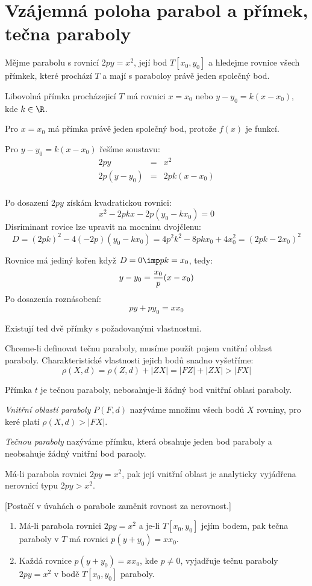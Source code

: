 
\BeginDoc{}
\section{Vzájemná poloha parabol a přímek, tečna paraboly}

\Pr
Mějme parabolu s rovnicí $2py  = x^2$, její bod $T[x_0,y_0]$ a hledejme rovnice všech přímkek, které prochází $T$ a mají s paraboloy právě jeden společný bod.

Libovolná přímka procházejicí $T$ má rovnici $x = x_0$ nebo $y-y_0 = k (x-x_0)$, kde $k\in\R$.

Pro $x = x_0$ má přímka právě jeden společný bod, protože $f(x)$ je funkcí.

Pro $y-y_0 = k(x-x_0)$ řešíme soustavu:
\begin{eqnarray}
	2py &=& x^2\\
	2p(y-y_0) &=& 2pk(x-x_0)\\
\end{eqnarray}

Po dosazení $2py$ získám kvadratickou rovnici:
$$ x^2 - 2pkx - 2p (y_0 - kx_0)  = 0 $$
Disriminant rovice lze upravit na mocninu dvojčlenu:
$$ D = (2pk)^2 - 4 (-2p)(y_0-kx_0) = 4p^2k^2 - 8 pkx_0 + 4 x_0^2 = (2pk - 2x_0)^2 $$

Rovnice má jediný kořen když $D = 0 \imp pk = x_0$, tedy:
$$y-y_0 = \frac{x_0}{p} (x-x_0)$$
Po dosazenía roznásobení:
$$ py + py_0 = xx_0 $$

Existují ted dvě přímky s požadovanými vlastnostmi.

\Poz Chceme-li definovat tečnu paraboly, musíme použít pojem vnitřní oblast paraboly.
Charakteristické vlastnosti jejich bodů snadno vyšetříme:
$$ \rho(X,d) = \rho(Z,d) + |ZX| = |FZ| + |ZX| > |FX| $$

Přímka $t$ je tečnou paraboly, nebosahuje-li žádný bod vnitřní oblasi paraboly.

\Def
\emph{Vnitřní oblastí paraboly} $P(F,d)$ nazýváme množinu všech bodů $X$ rovniny, pro keré platí $\rho(X,d) > |FX|$.

\Def
\emph{Tečnou paraboly} nazýváme přímku, která obsahuje jeden bod paraboly a neobsahuje žádný vnitřní bod paraoly.

\V Má-li parabola rovnici $2py = x^2$, pak její vnitřní oblast je analyticky vyjádřena nerovnicí typu $2py > x^2$.

[Postačí v úvahách o parabole zaměnit rovnost za nerovnost.]
\V
\begin{enumerate}
	\item Má-li parabola rovnici $2py = x^2$ a je-li $T[x_0,y_0]$ jejím bodem, pak tečna paraboly v $T$ má rovnici $p(y+y_0) = xx_0$.
	\item Každá rovnice $p(y+y_0) = xx_0$, kde $p\neq 0$, vyjadřuje tečnu paraboly $2py = x^2$ v bodě $T[x_0,y_0]$ paraboly.
\end{enumerate}

